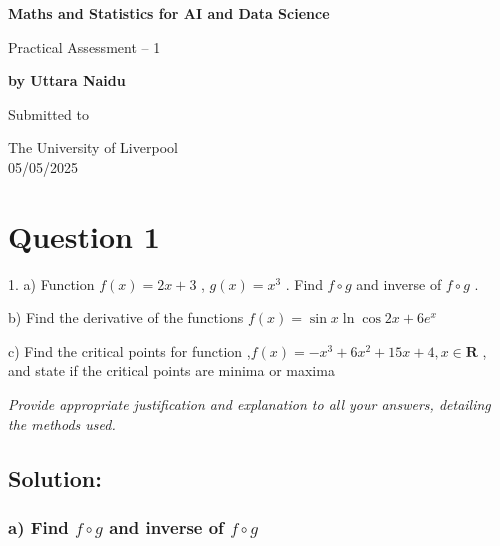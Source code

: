 \documentclass[a4paper]{report}
\begin{document}
\pagestyle{fancy}

\begin{titlepage}
    \begin{center}
        \vspace*{1cm}
            
        \Huge
        \textbf{Maths and Statistics for AI and Data Science}
            
        \vspace{0.5cm}
        \LARGE
        Practical Assessment – 1
            
        \vspace{1.5cm}
            
        \textbf{by Uttara Naidu}
            
        \vfill
            
        Submitted to            

        The University of Liverpool\\

        05/05/2025
            
    \end{center}
\end{titlepage}     



\section*{Question 1}

1. a) Function $f(x)=2x+3$ , $g(x)=x^3$ . Find $f{\circ}g$ and inverse of $f{\circ}g$ .  

b) Find the derivative of the functions  $f(x)=\sin x \ln \cos 2x+6{e^x}$ 

c) Find the critical points for function ,$f(x)=-x^3+6x^2+15x+4, x\in \mathbf{R}$  , and state if the critical points are minima or maxima 

\textit{Provide appropriate justification and explanation to all your answers, detailing the methods used.}

\subsection*{Solution:}

\subsubsection*{a) Find  $f{\circ}g$ and inverse of $f{\circ}g$}
\end{document}
